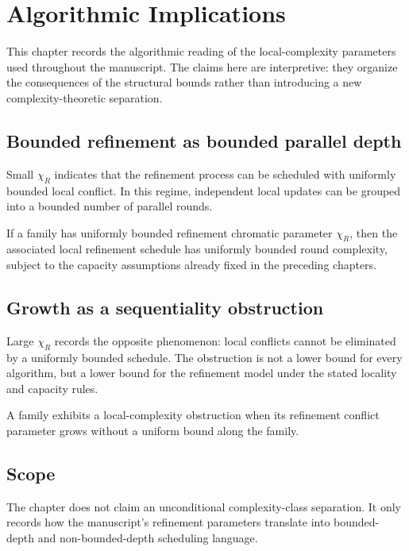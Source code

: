 \section{Algorithmic Implications}

This chapter records the algorithmic reading of the local-complexity
parameters used throughout the manuscript.  The claims here are
interpretive: they organize the consequences of the structural bounds
rather than introducing a new complexity-theoretic separation.

\subsection{Bounded refinement as bounded parallel depth}

Small $\chi_R$ indicates that the refinement process can be scheduled
with uniformly bounded local conflict.  In this regime, independent
local updates can be grouped into a bounded number of parallel rounds.

\begin{lemma}
If a family has uniformly bounded refinement chromatic parameter
$\chi_R$, then the associated local refinement schedule has uniformly
bounded round complexity, subject to the capacity assumptions already
fixed in the preceding chapters.
\end{lemma}

\subsection{Growth as a sequentiality obstruction}

Large $\chi_R$ records the opposite phenomenon: local conflicts cannot
be eliminated by a uniformly bounded schedule.  The obstruction is not
a lower bound for every algorithm, but a lower bound for the refinement
model under the stated locality and capacity rules.

\begin{definition}
A family exhibits a local-complexity obstruction when its refinement
conflict parameter grows without a uniform bound along the family.
\end{definition}

\subsection{Scope}

The chapter does not claim an unconditional complexity-class
separation.  It only records how the manuscript's refinement parameters
translate into bounded-depth and non-bounded-depth scheduling language.
